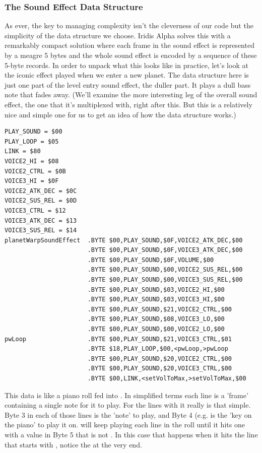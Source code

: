 \subsubsection{The Sound Effect Data Structure}
As ever, the key to managing complexity isn't the cleverness of our code but the simplicity of the data structure
we choose. Iridis Alpha solves this with a remarkably compact solution where each frame in the sound effect is represented
by a meagre 5 bytes and the whole sound effect is encoded by a sequence of these 5-byte records. In order to unpack
what this looks like in practice, let's look at the iconic effect played when we enter a new planet. The data structure
here is just one part of the level entry sound effect, the duller part. It plays a dull bass note that fades away. (We'll
examine the more interesting leg of the overall sound effect, the one that it's multiplexed with, right after this. But
this is a relatively nice and simple one for us to get an idea of how the data structure works.) 

\begin{lstlisting}
PLAY_SOUND = $00
PLAY_LOOP = $05
LINK = $80
VOICE2_HI = $08
VOICE2_CTRL = $0B
VOICE3_HI = $0F
VOICE2_ATK_DEC = $0C
VOICE2_SUS_REL = $0D
VOICE3_CTRL = $12
VOICE3_ATK_DEC = $13
VOICE3_SUS_REL = $14
planetWarpSoundEffect  .BYTE $00,PLAY_SOUND,$0F,VOICE2_ATK_DEC,$00
                       .BYTE $00,PLAY_SOUND,$0F,VOICE3_ATK_DEC,$00
                       .BYTE $00,PLAY_SOUND,$0F,VOLUME,$00
                       .BYTE $00,PLAY_SOUND,$00,VOICE2_SUS_REL,$00
                       .BYTE $00,PLAY_SOUND,$00,VOICE3_SUS_REL,$00
                       .BYTE $00,PLAY_SOUND,$03,VOICE2_HI,$00
                       .BYTE $00,PLAY_SOUND,$03,VOICE3_HI,$00
                       .BYTE $00,PLAY_SOUND,$21,VOICE2_CTRL,$00
                       .BYTE $00,PLAY_SOUND,$08,VOICE3_LO,$00
                       .BYTE $00,PLAY_SOUND,$00,VOICE2_LO,$00
pwLoop                 .BYTE $00,PLAY_SOUND,$21,VOICE3_CTRL,$01
                       .BYTE $18,PLAY_LOOP,$00,<pwLoop,>pwLoop
                       .BYTE $00,PLAY_SOUND,$20,VOICE2_CTRL,$00
                       .BYTE $00,PLAY_SOUND,$20,VOICE3_CTRL,$00
                       .BYTE $00,LINK,<setVolToMax,>setVolToMax,$00
\end{lstlisting}

This data is like a piano roll fed into . In simplified terms each line is a 'frame' containing
a single note for it to play. For the lines with  it really is that simple. Byte 3 in each of those lines
is the 'note' to play, and Byte 4 (e.g.  is the 'key on the piano' to play it on. 
will keep playing each line in the roll until it hits one with a value in Byte 5 that is not . In this case that
happens when it hits the line that starts with , notice the  at the very end.

